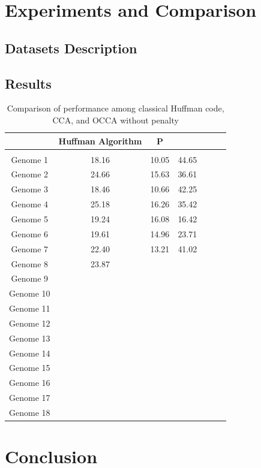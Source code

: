 \documentclass[preprint,12pt]{elsarticle}
\begin{document}
\section{Experiments and Comparison}
\subsection{Datasets Description}
\subsection{Results}
\begin{table}[h]
\renewcommand{\arraystretch}{1.1}
\small
\label{table4}
\caption{Comparison of performance among classical Huffman code, CCA, and OCCA without penalty}

\begin{tabular}{c  c c  c c  c c}
\hline
 & Huffman Algorithm & P \\\hline
\\\hline
Genome 1& 18.16 & 10.05 & 44.65 \\\hline
Genome 2& 24.66 &  15.63 & 36.61 \\\hline
Genome 3&18.46 &  10.66&  42.25\\\hline
Genome 4&25.18&16.26& 35.42\\\hline
Genome 5& 19.24& 16.08 &16.42 \\\hline
Genome 6& 19.61&14.96&23.71\\\hline
Genome 7& 22.40 &13.21&41.02\\\hline
Genome 8&23.87 & \\\hline
Genome 9& &\\\hline
Genome 10& & \\\hline
Genome 11& & \\\hline
Genome 12& &\\\hline
Genome 13& &\\\hline
Genome 14& & \\\hline
Genome 15& & \\\hline
Genome 16&& \\\hline
Genome 17& & \\\hline
Genome 18& & \\\hline

\end{tabular}
\end{table}
\section{Conclusion}
\end{document}
